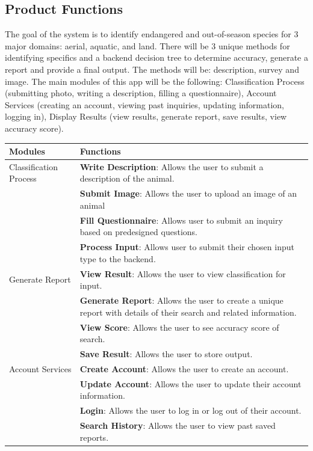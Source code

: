 \documentclass[]{article}
\begin{document}
\subsection{Product Functions}
\label{sub:product_functions}
The goal of the system is to identify endangered and out-of-season species for 3 major domains: aerial, aquatic,
and land. There will be 3 unique methods for identifying specifics and a backend decision tree to determine
accuracy, generate a report and provide a final output. The methods will be: description, survey and image. The main modules
of this app will be the following: Classification Process (submitting photo, writing a description, filling a questionnaire), Account Services (creating an account, viewing past inquiries, updating
information, logging in), Display Results (view results, generate report, save results, view accuracy score).
\begin{center}
    \begin{tabular}{ |p{4cm}|p{12cm}| } 
    \hline
    \textbf{Modules} & \textbf{Functions} \\
    \hline
    Classification Process
    & \textbf{Write Description}: Allows the user to submit a description of the animal. \\ 
    & \textbf{Submit Image}: Allows the user to upload an image of an animal \\ 
    & \textbf{Fill Questionnaire}: Allows user to submit an inquiry based on predesigned questions. \\ 
    & \textbf{Process Input}: Allows user to submit their chosen input type to the backend. \\
    \hline
    Generate Report
    & \textbf{View Result}: Allows the user to view classification for input. \\
    & \textbf{Generate Report}: Allows the user to create a unique report with details of their search and related information. \\ 
    & \textbf{View Score}: Allows the user to see accuracy score of search. \\
    & \textbf{Save Result}: Allows the user to store output. \\
    \hline	
    Account Services 
    & \textbf{Create Account}: Allows the user to create an account. \\ 
    & \textbf{Update Account}: Allows the user to update their account information. \\ 
    & \textbf{Login}: Allows the user to log in or log out of their account. \\ 
    & \textbf{Search History}: Allows the user to view past saved reports. \\
    \hline
    \end{tabular}
\end{center}
\end{document}
